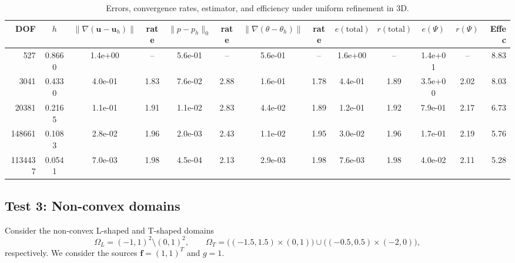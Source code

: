 \documentclass[10pt,a4paper]{article}
\begin{document}
\begin{table}[h!]
\centering
\begin{footnotesize}
\caption{Errors, convergence rates, estimator, and efficiency under uniform refinement in 3D.}
\begin{tabular}{rcccccccccccr}
\toprule
DOF & $h$ 
& $\|\nabla(\boldsymbol{u}-\boldsymbol{u}_h)\|$ & rate 
& $\|p-p_h\|_{0}$ & rate 
& $\|\nabla(\theta-\theta_h)\|$ & rate
& $e(\text{total})$ & $r(\text{total})$
& $e(\Psi)$ & $r(\Psi)$
& Effec \\
\midrule
527     & 0.8660 & 1.4e+00 & --   & 5.6e-01 & --   & 5.6e-01 &  --  & 1.6e+00 &   -- & 1.4e+01 &   -- & 8.83 \\
3041    & 0.4330 & 4.0e-01 & 1.83 & 7.6e-02 & 2.88 & 1.6e-01 & 1.78 & 4.4e-01 & 1.89 & 3.5e+00 & 2.02 & 8.03 \\
20381   & 0.2165 & 1.1e-01 & 1.91 & 1.1e-02 & 2.83 & 4.4e-02 & 1.89 & 1.2e-01 & 1.92 & 7.9e-01 & 2.17 & 6.73 \\
148661  & 0.1083 & 2.8e-02 & 1.96 & 2.0e-03 & 2.43 & 1.1e-02 & 1.95 & 3.0e-02 & 1.96 & 1.7e-01 & 2.19 & 5.76 \\
1134437 & 0.0541 & 7.0e-03 & 1.98 & 4.5e-04 & 2.13 & 2.9e-03 & 1.98 & 7.6e-03 & 1.98 & 4.0e-02 & 2.11 & 5.28 \\
\bottomrule
\end{tabular}
\label{table_3d_conv}
\end{footnotesize}
\end{table}
\subsection{Test 3: Non-convex domains}
Consider the non-convex  L-shaped and T-shaped domains 
$$ 
\Omega_L = (-1,1)^2 \setminus (0,1)^2, \qquad
\Omega_T = \bigl((-1.5,1.5)\times(0,1)\bigr) \cup \bigl((-0.5,0.5)\times(-2,0)\bigr),
$$ 
respectively. We consider the sources $\boldsymbol{f} = (1,1)^T $ and $ g= 1$. 
\end{document}
